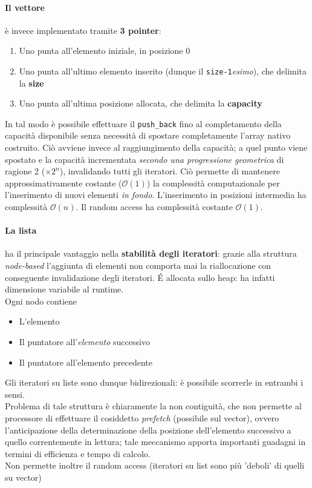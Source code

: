 \documentclass[10pt, oneside]{book}
\begin{document}
\paragraph{Il vettore} è invece implementato tramite \textbf{3 pointer}:
\begin{enumerate}
\item Uno punta all'elemento iniziale, in posizione 0
\item Uno punta all'ultimo elemento inserito (dunque il \texttt{size-1}\textit{esimo}), che delimita la \textbf{size}
\item Uno punta all'ultima posizione allocata, che delimita la \textbf{capacity}
\end{enumerate}
In tal modo è possibile effettuare il \texttt{push\_back} fino al completamento della capacità disponibile senza necessità di spostare completamente l'array nativo costruito. Ciò avviene invece al raggiungimento della capacità; a quel punto viene spostato e la capacità incrementata \textit{secondo una progressione geometrica} di ragione 2 ($\times 2^n$), invalidando tutti gli iteratori. Ciò permette di mantenere approssimativamente costante ($\mathcal{O}(1)$) la complessità computazionale per l'inserimento di nuovi elementi \textit{in fondo}. L'inserimento in posizioni intermedia ha complessità $\mathcal{O}(n)$. Il random access ha complessità costante $\mathcal{O}(1)$.
\paragraph{La lista} ha il principale vantaggio nella \textbf{stabilità degli iteratori}: grazie alla struttura \textit{node-based} l'aggiunta di elementi non comporta mai la riallocazione con conseguente invalidazione degli iteratori. \'E allocata sullo heap: ha infatti dimensione variabile al runtime.\\
Ogni nodo contiene
\begin{itemize}
\item L'elemento
\item Il puntatore all'\textit{elemento} successivo
\item Il puntatore all'elemento precedente
\end{itemize}
Gli iteratori su liste sono dunque bidirezionali: è possibile scorrerle in entrambi i sensi.\\
Problema di tale struttura è chiaramente la non contiguità, che non permette al processore di effettuare il cosiddetto \textit{prefetch} (possibile sul vector), ovvero l'anticipazione della determinazione della posizione dell'elemento successivo a quello correntemente in lettura; tale meccanismo apporta importanti guadagni in termini di efficienza e tempo di calcolo.\\
Non permette inoltre il random access (iteratori su list sono più 'deboli' di quelli su vector)
\end{document}
